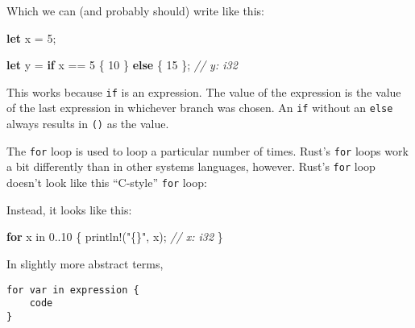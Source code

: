 \documentclass[a4paper,]{book}
\newenvironment{Shaded}{\begin{snugshade}}{\end{snugshade}}
\newcommand{\KeywordTok}[1]{\textcolor[rgb]{0.13,0.29,0.53}{\textbf{{#1}}}}
\newcommand{\DecValTok}[1]{\textcolor[rgb]{0.00,0.00,0.81}{{#1}}}
\newcommand{\CharTok}[1]{\textcolor[rgb]{0.31,0.60,0.02}{{#1}}}
\newcommand{\StringTok}[1]{\textcolor[rgb]{0.31,0.60,0.02}{{#1}}}
\newcommand{\CommentTok}[1]{\textcolor[rgb]{0.56,0.35,0.01}{\textit{{#1}}}}
\newcommand{\OtherTok}[1]{\textcolor[rgb]{0.56,0.35,0.01}{{#1}}}
\newcommand{\NormalTok}[1]{{#1}}
\begin{document}
Which we can (and probably should) write like this:

\begin{Shaded}
\begin{Highlighting}[]
\KeywordTok{let} \NormalTok{x = }\DecValTok{5}\NormalTok{;}

\KeywordTok{let} \NormalTok{y = }\KeywordTok{if} \NormalTok{x == }\DecValTok{5} \NormalTok{\{ }\DecValTok{10} \NormalTok{\} }\KeywordTok{else} \NormalTok{\{ }\DecValTok{15} \NormalTok{\}; }\CommentTok{// y: i32}
\end{Highlighting}
\end{Shaded}

This works because \texttt{if} is an expression. The value of the
expression is the value of the last expression in whichever branch was
chosen. An \texttt{if} without an \texttt{else} always results in
\texttt{()} as the value.


The \texttt{for} loop is used to loop a particular number of times.
Rust's \texttt{for} loops work a bit differently than in other systems
languages, however. Rust's \texttt{for} loop doesn't look like this
``C-style'' \texttt{for} loop:

\begin{Shaded}
\end{Shaded}

Instead, it looks like this:

\begin{Shaded}
\begin{Highlighting}[]
\KeywordTok{for} \NormalTok{x in }\DecValTok{0.}\NormalTok{.}\DecValTok{10} \NormalTok{\{}
    \OtherTok{println!}\NormalTok{(}\StringTok{"\{\}"}\NormalTok{, x); }\CommentTok{// x: i32}
\NormalTok{\}}
\end{Highlighting}
\end{Shaded}

In slightly more abstract terms,

\begin{verbatim}
for var in expression {
    code
}
\end{verbatim}
\end{document}
